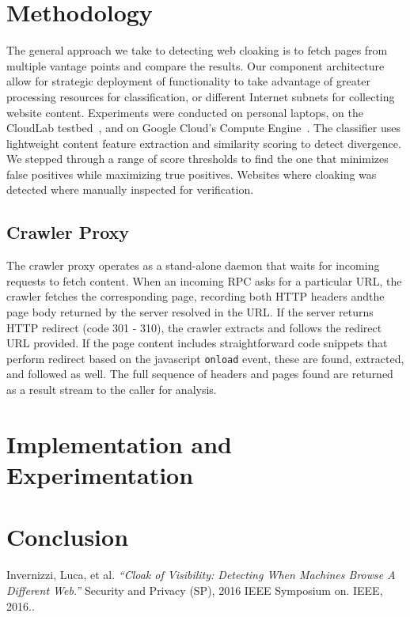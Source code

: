 \documentclass[letterpaper,twocolumn,10pt]{article}
\begin{document}
\section{Methodology}

The general approach we take to detecting web cloaking is to fetch pages from multiple vantage points and compare the results.  Our component architecture allow for strategic deployment of functionality to take advantage of greater processing resources for classification, or different Internet subnets for collecting website content. Experiments were conducted on personal laptops, on the CloudLab testbed~\cite{cloudlab}, and on Google Cloud's Compute Engine~\cite{gcloud}. The classifier uses lightweight content feature extraction and similarity scoring to detect divergence.  We stepped through a range of score thresholds to find the one that minimizes false positives while maximizing true positives.  Websites where cloaking was detected where manually inspected for verification.

\subsection{Crawler Proxy}

The crawler proxy operates as a stand-alone daemon that waits for incoming requests to fetch content.  When an incoming RPC asks for a particular URL, the crawler fetches the corresponding page, recording both HTTP headers andthe page body returned by the server resolved in the URL.  If the server returns HTTP redirect (code 301 - 310), the crawler extracts and follows the redirect URL provided.  If the page content includes straightforward code snippets that perform redirect based on the javascript \texttt{onload} event, these are found, extracted, and followed as well.  The full sequence of headers and pages found are returned as a result stream to the caller for analysis.

\section{Implementation and Experimentation}

\section{Conclusion}

\begin{thebibliography}{1}

   Invernizzi, Luca, et al. {\em ``Cloak of Visibility: Detecting When Machines Browse A Different Web.''} Security and Privacy (SP), 2016 IEEE Symposium on. IEEE, 2016..

\end{thebibliography}
\end{document}
